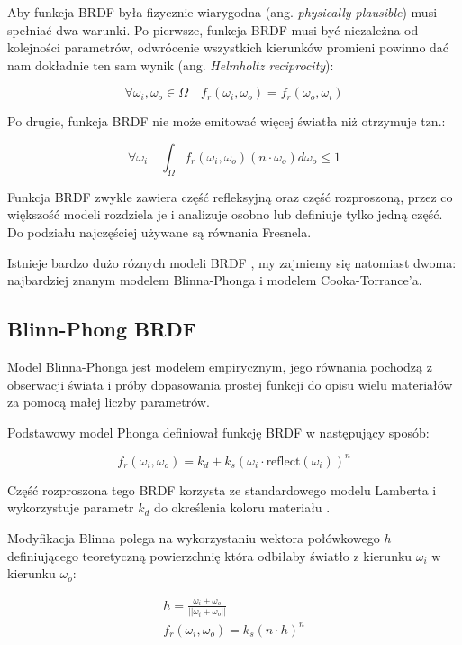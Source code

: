 \documentclass[../main.tex]{subfiles}
\begin{document}
Aby funkcja BRDF była fizycznie wiarygodna (ang. \textit{physically plausible})
musi spełniać dwa warunki. Po pierwsze, funkcja BRDF musi być niezależna od
kolejności parametrów, odwrócenie wszystkich kierunków promieni powinno dać nam
dokładnie ten sam wynik (ang. \textit{Helmholtz reciprocity}):

\[
  \forall{\omega_i, \omega_o \in \Omega} \quad
  f_r(\omega_i, \omega_o) = f_r(\omega_o, \omega_i)
\]

Po drugie, funkcja BRDF nie może emitować więcej światła niż otrzymuje tzn.:

\[
  \forall{\omega_i} \quad
  \int_{\Omega} {
    f_r(\omega_i, \omega_o)
    (n \cdot \omega_o)
    d\omega_o
  } \leq 1
\]

Funkcja BRDF zwykle zawiera część refleksyjną oraz część rozproszoną, przez co
większość modeli rozdziela je i analizuje osobno lub definiuje tylko jedną
część. Do podziału najczęściej używane są równania Fresnela.

Istnieje bardzo dużo róznych modeli BRDF \cite{brdf_overview}, my zajmiemy się
natomiast dwoma: najbardziej znanym modelem Blinna-Phonga i modelem
Cooka-Torrance'a.

\subsection{Blinn-Phong BRDF}

Model Blinna-Phonga jest modelem empirycznym, jego równania pochodzą z
obserwacji świata i próby dopasowania prostej funkcji do opisu wielu materiałów
za pomocą małej liczby parametrów.

Podstawowy model Phonga definiował funkcję BRDF w następujący sposób:

\[
f_r(\omega_i, \omega_o) =
  k_d + k_s \left(
    \omega_i \cdot
    \text{reflect}\left(\omega_i\right)
  \right)^{n}
\]

Część rozproszona tego BRDF korzysta ze standardowego modelu Lamberta i
wykorzystuje parametr $k_d$ do określenia koloru materiału .

Modyfikacja Blinna polega na wykorzystaniu wektora połówkowego $h$
definiującego teoretyczną powierzchnię która odbiłaby światło z kierunku
$\omega_i$ w kierunku $\omega_o$:

\begin{gather*}
  h = \frac{\omega_i + \omega_o}{||\omega_i+\omega_o||} \\
  f_r(\omega_i, \omega_o) = k_s (n \cdot h)^{n}
\end{gather*}
\end{document}

